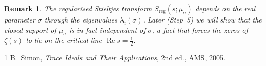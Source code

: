 \documentclass[11pt,a4paper]{article}
\newtheorem{remark}[theorem]{Remark}
\newcommand{\RE}{\operatorname{Re}}
\begin{document}
\begin{remark}
The regularised Stieltjes transform \(S_{\mathrm{reg}}(s;\mu_\sigma)\) depends on the real parameter \(\sigma\) through the eigenvalues \(\lambda_i(\sigma)\).  Later (Step~5) we will show that the closed support of \(\mu_\sigma\) is in fact independent of \(\sigma\), a fact that forces the zeros of \(\zeta(s)\) to lie on the critical line \(\RE s = \frac12\).
\end{remark}

\begin{thebibliography}{1}
 B.~Simon, \emph{Trace Ideals and Their Applications}, 2nd ed., AMS, 2005.
\end{thebibliography}
\end{document}
